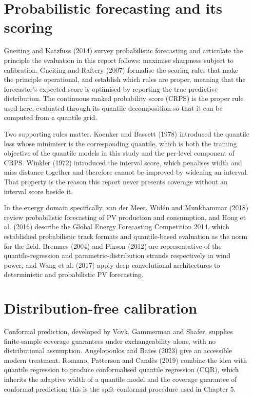 \documentclass[11pt,a4paper,oneside]{report}
\begin{document}
\section{Probabilistic forecasting and its scoring}

Gneiting and Katzfuss (2014) survey probabilistic forecasting and articulate the principle the evaluation in this report follows: maximise sharpness subject to calibration. Gneiting and Raftery (2007) formalise the scoring rules that make the principle operational, and establish which rules are proper, meaning that the forecaster's expected score is optimised by reporting the true predictive distribution. The continuous ranked probability score (CRPS) is the proper rule used here, evaluated through its quantile decomposition so that it can be computed from a quantile grid.

Two supporting rules matter. Koenker and Bassett (1978) introduced the quantile loss whose minimiser is the corresponding quantile, which is both the training objective of the quantile models in this study and the per-level component of CRPS. Winkler (1972) introduced the interval score, which penalises width and miss distance together and therefore cannot be improved by widening an interval. That property is the reason this report never presents coverage without an interval score beside it.

In the energy domain specifically, van der Meer, Widén and Munkhammar (2018) review probabilistic forecasting of PV production and consumption, and Hong et al. (2016) describe the Global Energy Forecasting Competition 2014, which established probabilistic track formats and quantile-based evaluation as the norm for the field. Bremnes (2004) and Pinson (2012) are representative of the quantile-regression and parametric-distribution strands respectively in wind power, and Wang et al. (2017) apply deep convolutional architectures to deterministic and probabilistic PV forecasting.

\section{Distribution-free calibration}

Conformal prediction, developed by Vovk, Gammerman and Shafer, supplies finite-sample coverage guarantees under exchangeability alone, with no distributional assumption. Angelopoulos and Bates (2023) give an accessible modern treatment. Romano, Patterson and Candès (2019) combine the idea with quantile regression to produce conformalised quantile regression (CQR), which inherits the adaptive width of a quantile model and the coverage guarantee of conformal prediction; this is the split-conformal procedure used in Chapter 5.
\end{document}
